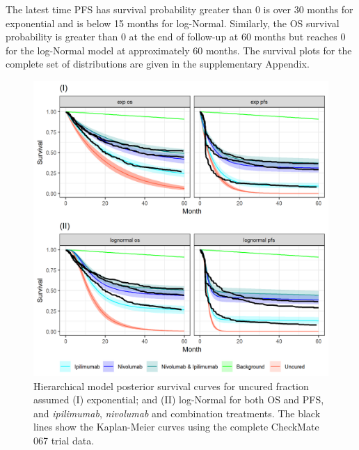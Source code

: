 \documentclass[AMA,STIX1COL]{WileyNJD-v2}
\begin{document}
The latest time PFS has survival probability greater than 0 is over 30 months for exponential and is below 15 months for log-Normal.
Similarly, the OS survival probability is greater than 0 at the end of follow-up at 60 months but reaches 0 for the log-Normal model at approximately 60 months.
The survival plots for the complete set of distributions are given in the supplementary Appendix.


\begin{figure}
\centering
\includegraphics[width=0.7\linewidth]{plot_S_exp_lognormal_grid_cf_hier.png}
\caption{\label{fig:S_exp_lnorm_cf_hier} Hierarchical model posterior survival curves for uncured fraction assumed (I) exponential; and (II) log-Normal for both OS and PFS, and {\it ipilimumab}, {\it nivolumab} and combination treatments. The black lines show the Kaplan-Meier curves using the complete CheckMate 067 trial data.}
\end{figure}
\end{document}
